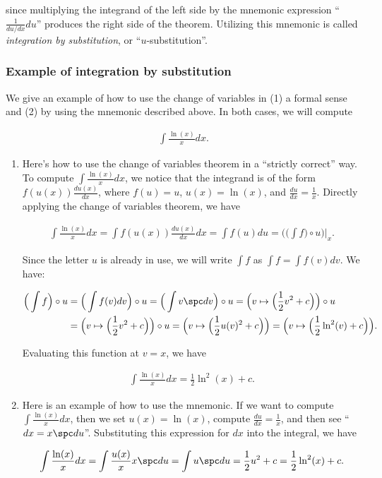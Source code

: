since multiplying the integrand of the left side by the mnemonic expression ``$\frac{1}{du/dx} du$'' produces the right side of the theorem. Utilizing this mnemonic is called \textit{integration by substitution}, or ``$u$-substitution''.

\subsubsection*{Example of integration by substitution}

We give an example of how to use the change of variables in (1) a formal sense and (2) by using the mnemonic described above. In both cases, we will compute

\begin{align*}
    \int \frac{\ln(x)}{x} dx.
\end{align*}


\begin{enumerate}
    \item Here's how to use the change of variables theorem in a ``strictly correct'' way. To compute $\int \frac{\ln(x)}{x} dx$, we notice that the integrand is of the form $f(u(x)) \frac{du(x)}{dx}$, where $f(u) = u$, $u(x) = \ln(x)$, and $\frac{du}{dx} = \frac{1}{x}$. Directly applying the change of variables theorem, we have 
    
    \begin{align*}
        \int \frac{\ln(x)}{x} dx = \int f(u(x)) \frac{du(x)}{dx} dx = \int f(u) du = \Big(\Big(\int f\Big) \circ u\Big)\Big|_x.
    \end{align*}
    
    Since the letter $u$ is already in use, we will write $\int f$ as $\int f = \int f(v) dv$. We have:
    
    \begin{align*}
        \Big(\int f\Big) \circ u &= \Big(\int f(v) dv \Big) \circ u = \Big(\int v \spc dv \Big) \circ u = \Big( v \mapsto \Big( \frac{1}{2}v^2 + c \Big) \Big) \circ u \\
        &= \Big( v \mapsto \Big( \frac{1}{2}v^2 + c \Big) \Big) \circ u = \Big( v \mapsto \Big( \frac{1}{2}u(v)^2 + c \Big) \Big)
        =  \Big( v \mapsto \Big( \frac{1}{2}\ln^2(v) + c \Big) \Big).
    \end{align*}
    
    Evaluating this function at $v = x$, we have 
    
    \begin{align*}
        \int \frac{\ln(x)}{x} dx = \frac{1}{2} \ln^2(x) + c.
    \end{align*}
    
    \item Here is an example of how to use the mnemonic. If we want to compute $\int \frac{\ln(x)}{x} dx$, then we set $u(x) = \ln(x)$, compute $\frac{du}{dx} = \frac{1}{x}$, and then see ``$dx = x \spc du$''. Substituting this expression for $dx$ into the integral, we have
    
    \begin{align*}
        \int \frac{\ln(x)}{x} dx = \int \frac{u(x)}{x} x \spc du = \int u \spc du = \frac{1}{2} u^2 + c = \frac{1}{2}\ln^2(x) + c.
    \end{align*}
\end{enumerate}